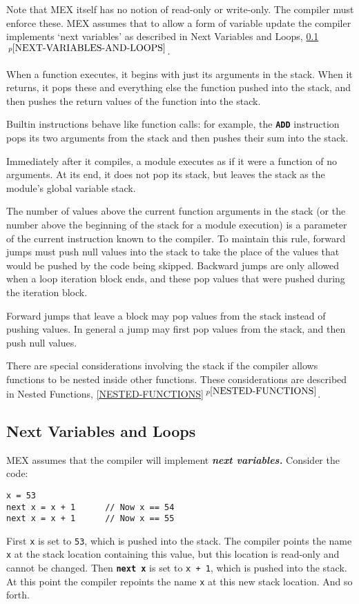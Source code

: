 \documentclass[12pt]{article}
\newcommand{\TT}[1]{{\tt \bfseries #1}}
\newcommand{\skey}[2]{{\bf \em #1#2}\index{#1}}
\newcommand{\itemref}[1]{\ref{#1}$\,^{p\pageref{#1}}$}
\newenvironment{indpar}[1][0.3in]%
	{\begin{list}{}%
		     {\setlength{\itemsep}{0in}%
		      \setlength{\topsep}{0in}%
		      \setlength{\parsep}{1ex}%
		      \setlength{\labelwidth}{#1}%
		      \setlength{\leftmargin}{#1}%
		      \addtolength{\leftmargin}{\labelsep}}%
	 \item}%
	{\end{list}}
\begin{document}
Note that MEX itself has no notion of read-only or write-only.
The compiler must enforce these.  MEX assumes that to allow
a form of variable update the compiler implements `next variables'
as described in Next Variables and Loops, \itemref{NEXT-VARIABLES-AND-LOOPS}.

When a function executes, it begins with just its arguments
in the stack.  When it returns, it pops these and everything
else the function pushed into the stack, and then pushes
the return values of the function into the stack.

Builtin instructions behave like function calls: for example,
the \TT{ADD} instruction pops its two arguments from the stack
and then pushes their sum into the stack.

Immediately after it compiles, a module executes as if it were a function
of no arguments.  At its end, it does not pop its stack, but
leaves the stack as the module's global variable stack.

The number of values above the current function arguments in the
stack (or the number above the beginning of the stack for a
module execution) is a parameter of the current instruction known
to the compiler.  To maintain this rule, forward jumps must push
null values into the stack to take the place of the values that would be
pushed by the code being skipped.  Backward jumps are only allowed when
a loop iteration block ends, and these pop values that were pushed
during the iteration block.

Forward jumps that leave a block may pop values from the stack
instead of pushing values.  In general a jump may first pop
values from the stack, and then push null values.

There are special considerations involving the stack if the
compiler allows functions to be nested inside other functions.
These considerations are described in Nested Functions,
\itemref{NESTED-FUNCTIONS}.

\subsection{Next Variables and Loops}
\label{NEXT-VARIABLES-AND-LOOPS}

MEX assumes that the compiler will implement \skey{next variables}.
Consider the code:
\begin{indpar}\begin{verbatim}
x = 53
next x = x + 1      // Now x == 54
next x = x + 1      // Now x == 55
\end{verbatim}\end{indpar}
First {\tt x} is set to {\tt 53}, which is pushed into the stack.
The compiler points the name
{\tt x} at the stack location containing this value,
but this location is read-only and cannot be changed.
Then \TT{next x} is set to {\tt x + 1}, which is pushed into the stack.
At this point the compiler repoints the name {\tt x} at this new
stack location.  And so forth.
\end{document}
